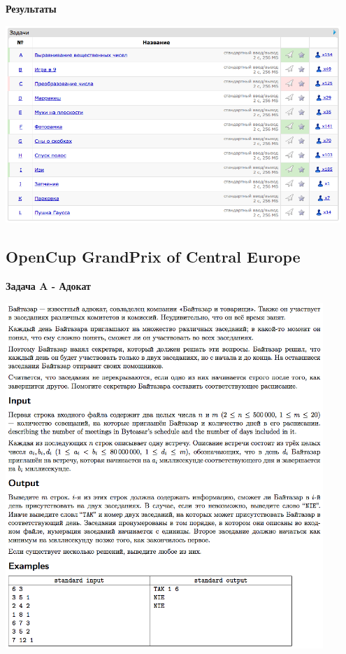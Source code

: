 \documentclass[a4paper,12pt]{article}
\begin{document}
\textbf{{\large Результаты}} \\
\begin{center}
\includegraphics[width=0.95\textwidth]{CT_school_nn/CT_school_nn_result.png}\\ [1cm]
\end{center}



%
%
\newpage
\subsection{OpenCup GrandPrix of Central Europe}

\textbf{{\large Задача A - Адокат}} \\
\begin{center}
\includegraphics[width=0.9\textwidth]{OC_Central_Europe/OC_Central_Europe_A.png}\\ [1cm]
\end{center}
\newpage
\end{document}
